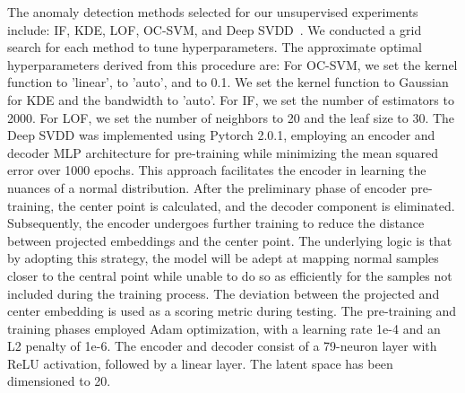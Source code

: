 \documentclass[lettersize,journal]{IEEEtran}
\begin{document}
The anomaly detection methods selected for our unsupervised experiments include: \ac{IF}, \ac{KDE}, \ac{LOF}, \ac{OC-SVM}, and \ac{Deep SVDD}~\cite{ruff2018deep}. We conducted a grid search for each method to tune hyperparameters. The approximate optimal hyperparameters derived from this procedure are: For \ac{OC-SVM}, we set the kernel function to 'linear',  to 'auto', and  to 0.1. We set the kernel function to Gaussian for \ac{KDE} and the bandwidth to 'auto'. For \ac{IF}, we set the number of estimators to 2000. For \ac{LOF}, we set the number of neighbors to 20 and the leaf size to 30. The \ac{Deep SVDD} was implemented using Pytorch 2.0.1, employing an encoder and decoder \ac{MLP} architecture for pre-training while minimizing the mean squared error over 1000 epochs. This approach facilitates the encoder in learning the nuances of a normal distribution. After the preliminary phase of encoder pre-training, the center point is calculated, and the decoder component is eliminated. Subsequently, the encoder undergoes further training to reduce the distance between projected embeddings and the center point. The underlying logic is that by adopting this strategy, the model will be adept at mapping normal samples closer to the central point while unable to do so as efficiently for the samples not included during the training process. The deviation between the projected and center embedding is used as a scoring metric during testing. The pre-training and training phases employed Adam optimization, with a learning rate 1e-4 and an L2 penalty of 1e-6. The encoder and decoder consist of a 79-neuron layer with ReLU activation, followed by a linear layer. The latent space has been dimensioned to 20.
\end{document}

